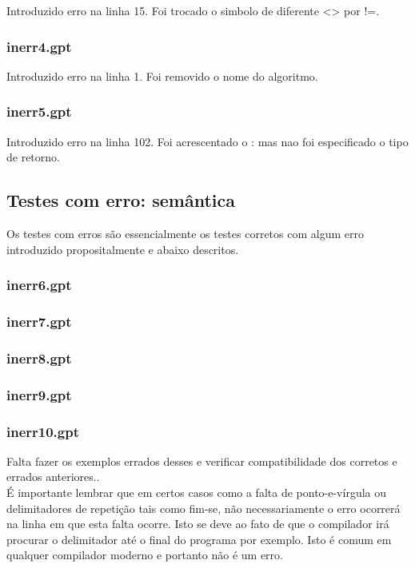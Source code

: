 \documentclass[a4paper,12pt]{report}
\begin{document}
Introduzido erro na linha 15. Foi trocado o simbolo de diferente <> por !=.

\subsubsection{inerr4.gpt}

Introduzido erro na linha 1. Foi removido o nome do algoritmo.

\subsubsection{inerr5.gpt}

Introduzido erro na linha 102. Foi acrescentado o : mas nao foi especificado o tipo de retorno.

\subsection{Testes com erro: sem\^antica}

Os testes com erros s\~ao essencialmente os testes corretos com algum erro 
introduzido propositalmente e abaixo descritos.

\subsubsection{inerr6.gpt}


\subsubsection{inerr7.gpt}


\subsubsection{inerr8.gpt}


\subsubsection{inerr9.gpt}


\subsubsection{inerr10.gpt}

Falta fazer os exemplos errados desses e verificar compatibilidade dos corretos e 
errados anteriores..
\\

\'E importante lembrar que em certos casos como a falta de ponto-e-v\'irgula ou delimitadores
de repeti\c{c}\~ao tais 
como fim-se, n\~ao necessariamente o erro ocorrer\'a na linha em que esta falta ocorre. 
Isto se deve ao fato de que o compilador 
ir\'a procurar o delimitador at\'e o final do programa por exemplo.
Isto \'e comum em qualquer compilador moderno e portanto n\~ao \'e um erro.
\end{document}
